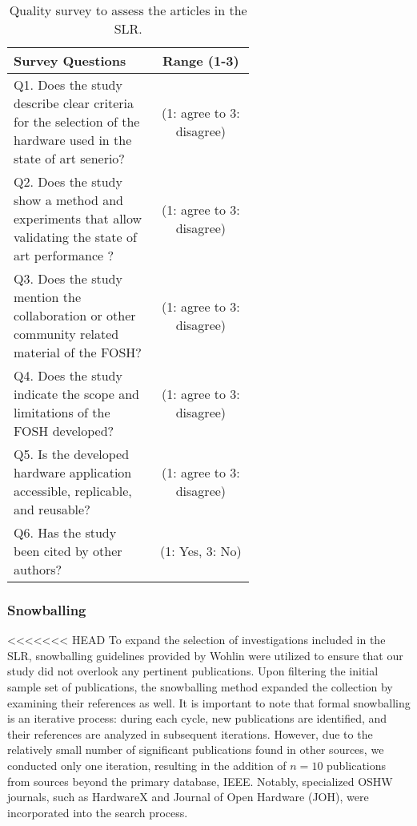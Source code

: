 \documentclass[final-report.tex]{subfiles}
\begin{document}
\begin{table}[htbp]
\centering
\caption{Quality survey to assess the articles in the SLR.}
\begin{tabular}{|p{0.6\linewidth}|c|}
\hline
\textbf{Survey Questions} & \textbf{Range (1-3)} \\
\hline
Q1. Does the study describe clear criteria for the selection of the hardware used in the state of art senerio? & (1: agree to 3: disagree) \\
\hline
Q2. Does the study show a method and experiments that allow validating the state of art performance ? & (1: agree to 3: disagree) \\
\hline
Q3. Does the study mention the collaboration or other community related material of the FOSH? & (1: agree to 3: disagree) \\
\hline
Q4. Does the study indicate the scope and limitations of the FOSH developed? & (1: agree to 3: disagree) \\
\hline
Q5. Is the developed hardware application accessible, replicable, and reusable? & (1: agree to 3: disagree) \\
\hline
Q6. Has the study been cited by other authors? & (1: Yes, 3: No) \\
\hline
\end{tabular}
\end{table}


\subsubsection{Snowballing}

<<<<<<< HEAD
To expand the selection of investigations included in the SLR, snowballing guidelines provided by Wohlin \cite{wohlin2014guidelines} were utilized to ensure that our study did not overlook any pertinent publications. Upon filtering the initial sample set of publications, the snowballing method expanded the collection by examining their references as well. It is important to note that formal snowballing is an iterative process: during each cycle, new publications are identified, and their references are analyzed in subsequent iterations. However, due to the relatively small number of significant publications found in other sources, we conducted only one iteration, resulting in the addition of $n=10$ publications from sources beyond the primary database, IEEE. Notably, specialized OSHW journals, such as HardwareX and Journal of Open Hardware (JOH), were incorporated into the search process.
\end{document}
